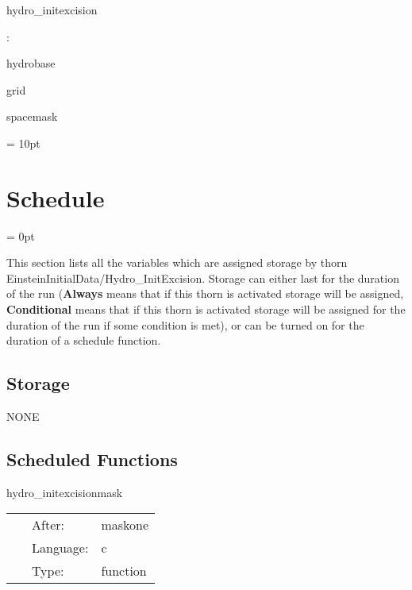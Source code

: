 \documentclass{article}
\begin{document}
hydro\_initexcision
\vspace{2mm}

: 

hydrobase

grid

spacemask
\vspace{2mm}

\vspace{5mm}\parskip = 10pt 

\section{Schedule} 


\parskip = 0pt


\noindent This section lists all the variables which are assigned storage by thorn EinsteinInitialData/Hydro\_InitExcision.  Storage can either last for the duration of the run ({\bf Always} means that if this thorn is activated storage will be assigned, {\bf Conditional} means that if this thorn is activated storage will be assigned for the duration of the run if some condition is met), or can be turned on for the duration of a schedule function.


\subsection*{Storage}NONE
\subsection*{Scheduled Functions}
\vspace{5mm}


\hspace{5mm} hydro\_initexcisionmask 

\hspace{5mm}{\it sets up the excision mask } 


\hspace{5mm}

 \begin{tabular*}{160mm}{cll} 
~ & After:  & maskone \\ 
~ & Language:  & c \\ 
~ & Type:  & function \\ 
\end{tabular*} 


\vspace{5mm}
\end{document}
